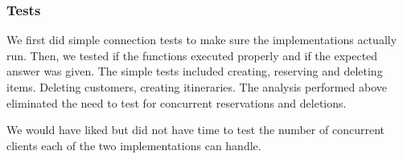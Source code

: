 \documentclass[12pt]{article}
\theoremstyle{plain}%
\theoremstyle{definition}
\theoremstyle{remark}
\begin{document}
\subsubsection*{Tests}
We first did simple connection tests to make sure the implementations
actually run. Then, we tested if the functions executed properly and
if the expected answer was given. The simple tests included creating,
reserving and deleting items. Deleting customers, creating
itineraries. The analysis performed above eliminated the need to test
for concurrent reservations and deletions. 

We would have liked but did not have time to test the number of
concurrent clients each of the two implementations can handle.
\end{document}

